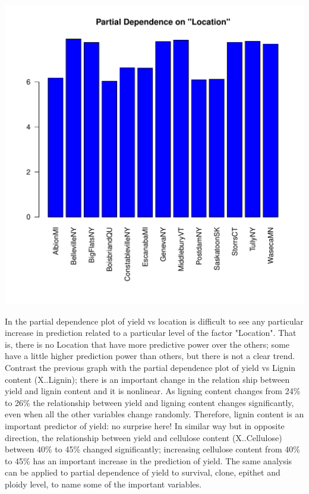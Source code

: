 \documentclass{article}\usepackage[]{graphicx}\usepackage[]{color}
\makeatletter
\def\maxwidth{ %
  \ifdim\Gin@nat@width>\linewidth
    \linewidth
  \else
    \Gin@nat@width
  \fi
}
\newenvironment{knitrout}{}{} %
\makeatother
\begin{document}
\begin{knitrout}
\color{fgcolor}

{\centering \includegraphics[width=\maxwidth]{figure/PartialDependenceLocation-1} 

}



\end{knitrout}

In the partial dependence plot of yield vs location is difficult to see any particular increase in prediction related to a particular level of the factor "Location". That is, there is no Location that have more predictive power over the others; some have a little higher prediction power than others, but there is not a clear trend. Contrast the previous graph with the partial dependence plot of yield vs Lignin content (X..Lignin); there is an  important change in the relation ship between yield and lignin content and it is nonlinear. As ligning content changes from 24\% to 26\%  the relationship between yield and ligning content changes significantly, even when all the other variables change randomly.
Therefore, lignin content is an important predictor of yield: no surprise here! In similar way but in opposite direction, the relationship between yield and cellulose content (X..Cellulose) between 40\% to 45\% changed significantly; increasing cellulose content from 40\% to 45\% has an important increase in the prediction of yield. The same analysis can be applied to partial dependence of yield to survival, clone, epithet and ploidy level, to name some of the important variables.  
\end{document}
